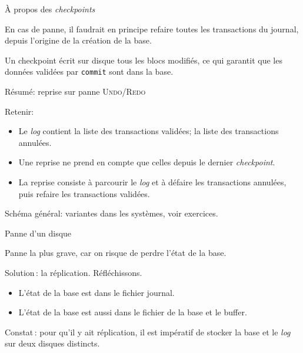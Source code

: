\begin{frame}{À propos des \textit{checkpoints}}


En cas de panne, il faudrait en principe refaire
toutes les transactions du journal, \alert{depuis l'origine
de la création de la base}.

\vfill

Un \alert{checkpoint} écrit sur disque tous les blocs
modifiés, ce qui garantit que les données validées par
\texttt{commit}
sont dans la base. 

\vfill


\end{frame}

\begin{frame}{Résumé: reprise sur panne \textsc{Undo/Redo}}

Retenir:

\vfill

\begin{itemize}

  \item Le \textit{log} contient la liste des transactions
      validées; la liste des transactions annulées.
      
  \item Une reprise ne prend en compte que celles depuis le dernier \textit{checkpoint}.
  
  \item La reprise consiste à parcourir le \textit{log} et à \alert{défaire} les
     transactions annulées, puis \alert{refaire} les transactions validées.
 \end{itemize}

\vfill

\begin{block}{}
Schéma général: variantes dans les systèmes, voir
exercices.
\end{block}
\end{frame}



\begin{frame}{Panne d'un disque}

Panne la plus grave, car on risque de perdre \alert{l'état de la base}.

\vfill

Solution\,: \alert{la réplication}. Réfléchissons.

\vfill

\begin{itemize}
  \item L'état de la base est dans le fichier journal.
    \item L'état de la base est \alert{aussi} dans le fichier de la base et le buffer.
\end{itemize}

\vfill

\begin{block}{}
\alert{Constat}\,: pour qu'il y ait réplication, il est \alert{impératif} de stocker la base et le \textit{log} 
sur deux disques \alert{distincts}.
\end{block}

\end{frame}


